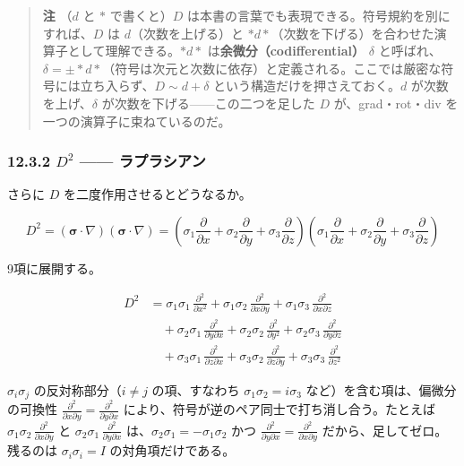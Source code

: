 \documentclass[a4paper,12pt,openany]{book}
\begin{document}
\begin{quote}
\textbf{注} （\(d\) と \(\ast\) で書くと）\(D\)
は本書の言葉でも表現できる。符号規約を別にすれば、\(D\) は
\(d\)（次数を上げる）と
\(\ast d\ast\)（次数を下げる）を合わせた演算子として理解できる。\(\ast d\ast\)
は\textbf{余微分（codifferential）} \(\delta\)
と呼ばれ、\(\delta = \pm\ast d\ast\)（符号は次元と次数に依存）と定義される。ここでは厳密な符号には立ち入らず、\(D \sim d + \delta\)
という構造だけを押さえておく。\(d\) が次数を上げ、\(\delta\)
が次数を下げる——この二つを足した \(D\) が、grad・rot・div
を一つの演算子に束ねているのだ。
\end{quote}

\hypertarget{d2-ux30e9ux30d7ux30e9ux30b7ux30a2ux30f3}{%
\subsubsection{\texorpdfstring{12.3.2 \(D^2\) ——
ラプラシアン}{12.3.2 D\^{}2 —— ラプラシアン}}\label{d2-ux30e9ux30d7ux30e9ux30b7ux30a2ux30f3}}

さらに \(D\) を二度作用させるとどうなるか。

\[D^2 = (\bm{\sigma}\!\cdot\!\nabla)(\bm{\sigma}\!\cdot\!\nabla) = (\sigma_1\frac{\partial}{\partial x} + \sigma_2\frac{\partial}{\partial y} + \sigma_3\frac{\partial}{\partial z})(\sigma_1\frac{\partial}{\partial x} + \sigma_2\frac{\partial}{\partial y} + \sigma_3\frac{\partial}{\partial z})\]

9項に展開する。

\[
\begin{aligned}
D^2 &= \sigma_1\sigma_1\,\frac{\partial^2}{\partial x^2} + \sigma_1\sigma_2\,\frac{\partial^2}{\partial x\partial y} + \sigma_1\sigma_3\,\frac{\partial^2}{\partial x\partial z} \\
&\quad + \sigma_2\sigma_1\,\frac{\partial^2}{\partial y\partial x} + \sigma_2\sigma_2\,\frac{\partial^2}{\partial y^2} + \sigma_2\sigma_3\,\frac{\partial^2}{\partial y\partial z} \\
&\quad + \sigma_3\sigma_1\,\frac{\partial^2}{\partial z\partial x} + \sigma_3\sigma_2\,\frac{\partial^2}{\partial z\partial y} + \sigma_3\sigma_3\,\frac{\partial^2}{\partial z^2}
\end{aligned}
\]

\(\sigma_i\sigma_j\) の反対称部分（\(i\neq j\) の項、すなわち
\(\sigma_1\sigma_2 = i\sigma_3\) など）を含む項は、偏微分の可換性
\(\frac{\partial^2}{\partial x\partial y} = \frac{\partial^2}{\partial y\partial x}\)
により、符号が逆のペア同士で打ち消し合う。たとえば
\(\sigma_1\sigma_2\,\frac{\partial^2}{\partial x\partial y}\) と
\(\sigma_2\sigma_1\,\frac{\partial^2}{\partial y\partial x}\)
は、\(\sigma_2\sigma_1 = -\sigma_1\sigma_2\) かつ
\(\frac{\partial^2}{\partial y\partial x} = \frac{\partial^2}{\partial x\partial y}\)
だから、足してゼロ。残るのは \(\sigma_i\sigma_i = I\)
の対角項だけである。
\end{document}
